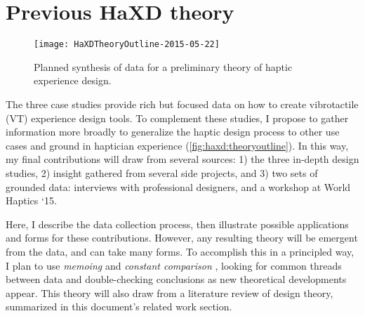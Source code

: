 
\section{Previous HaXD theory}


\begin{figure}[h] %
   \centering
   \texttt{[image: HaXDTheoryOutline-2015-05-22]} 
   \caption{Planned synthesis of data for a preliminary theory of haptic experience design.}
   \label{fig:haxd:theoryoutline}
\end{figure}


The three case studies provide rich but focused data on how to create vibrotactile (VT) experience design tools.
To complement these studies, I propose to gather information more broadly to generalize the haptic design process to other use cases and ground in haptician experience (\autoref{fig:haxd:theoryoutline}).
In this way, my final contributions will draw from several sources: 
1) the three in-depth design studies,
2) insight gathered from several side projects, and
3) two sets of grounded data: interviews with professional designers, and
a workshop at World Haptics `15.

Here, I describe the data collection process, then illustrate possible applications and forms for these contributions.
However, any resulting theory will be emergent from the data, and can take many forms.
To accomplish this in a principled way, I plan to use \emph{memoing} and \emph{constant comparison} \cite{Corbin2008}, looking for common threads between data and double-checking conclusions as new theoretical developments appear.
This theory will also draw from a literature review of design theory, summarized in this document's related work section.




